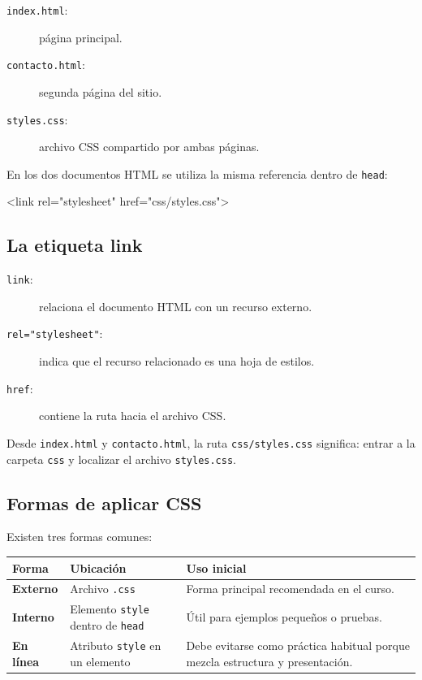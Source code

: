 \documentclass[11pt]{article}
\begin{document}
    \begin{description}
        \item[\texttt{index.html}:] página principal.
        \item[\texttt{contacto.html}:] segunda página del sitio.
        \item[\texttt{styles.css}:] archivo CSS compartido por ambas páginas.
    \end{description}

    En los dos documentos HTML se utiliza la misma referencia dentro de \texttt{head}:

    \begin{htmlcodedark}
        <link rel="stylesheet" href="css/styles.css">
    \end{htmlcodedark}

    \subsection{La etiqueta link}

    \begin{description}
        \item[\texttt{link}:] relaciona el documento HTML con un recurso externo.
        \item[\texttt{rel="stylesheet"}:] indica que el recurso relacionado es una hoja de estilos.
        \item[\texttt{href}:] contiene la ruta hacia el archivo CSS.
    \end{description}

    Desde \texttt{index.html} y \texttt{contacto.html}, la ruta \texttt{css/styles.css} significa: entrar a la carpeta \texttt{css} y localizar el archivo \texttt{styles.css}.


    \subsection{Formas de aplicar CSS}

    Existen tres formas comunes:

    \begin{center}
        \begin{tabularx}{0.94\textwidth}{>{\bfseries}p{2.8cm}p{4.4cm}X}
            \toprule
            Forma & Ubicación & Uso inicial \\
            \midrule
            Externo & Archivo \texttt{.css} & Forma principal recomendada en el curso. \\
            Interno & Elemento \texttt{style} dentro de \texttt{head} & Útil para ejemplos pequeños o pruebas. \\
            En línea & Atributo \texttt{style} en un elemento & Debe evitarse como práctica habitual porque mezcla estructura y presentación. \\
            \bottomrule
        \end{tabularx}
    \end{center}
\end{document}
